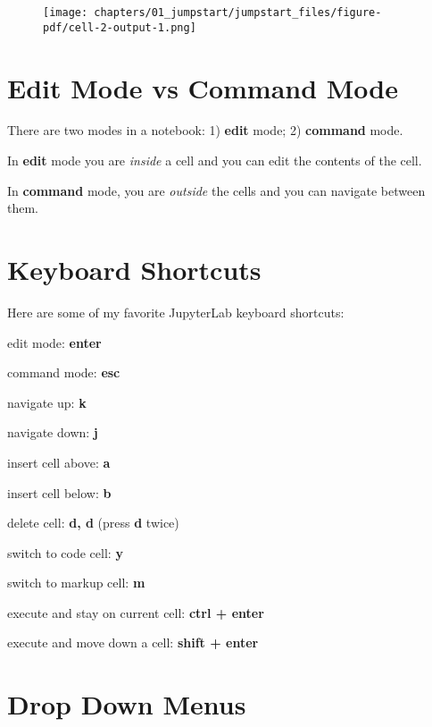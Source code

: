 \documentclass[
  letterpaper,
  DIV=11,
  numbers=noendperiod]{scrreprt}
\begin{document}
\begin{figure}[H]

{\centering \texttt{[image: chapters/01\_jumpstart/jumpstart\_files/figure-pdf/cell-2-output-1.png]}

}

\end{figure}

\hypertarget{edit-mode-vs-command-mode}{%
\section{Edit Mode vs Command Mode}\label{edit-mode-vs-command-mode}}

There are two modes in a notebook: 1) \textbf{edit} mode; 2)
\textbf{command} mode.

In \textbf{edit} mode you are \emph{inside} a cell and you can edit the
contents of the cell.

In \textbf{command} mode, you are \emph{outside} the cells and you can
navigate between them.

\hypertarget{keyboard-shortcuts}{%
\section{Keyboard Shortcuts}\label{keyboard-shortcuts}}

Here are some of my favorite JupyterLab keyboard shortcuts:

edit mode: \textbf{enter}

command mode: \textbf{esc}

navigate up: \textbf{k}

navigate down: \textbf{j}

insert cell above: \textbf{a}

insert cell below: \textbf{b}

delete cell: \textbf{d, d} (press \textbf{d} twice)

switch to code cell: \textbf{y}

switch to markup cell: \textbf{m}

execute and stay on current cell: \textbf{ctrl + enter}

execute and move down a cell: \textbf{shift + enter}

\hypertarget{drop-down-menus}{%
\section{Drop Down Menus}\label{drop-down-menus}}
\end{document}
